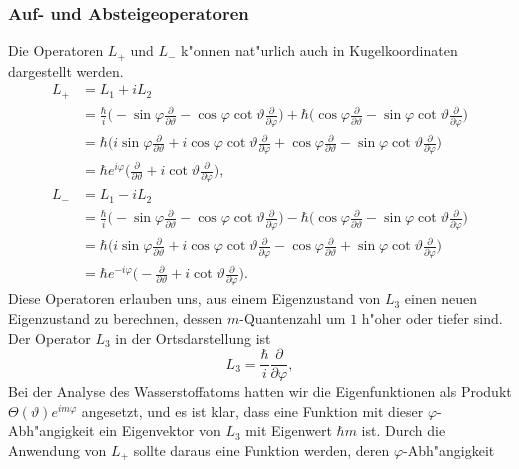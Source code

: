 \subsubsection{Auf- und Absteigeoperatoren}
Die Operatoren $L_+$ und $L_-$ k"onnen nat"urlich auch in Kugelkoordinaten
dargestellt werden.
\begin{align*}
L_+
&=
L_1+iL_2
\\
&=
\frac{\hbar}{i}\biggl(
-\sin\varphi\frac{\partial}{\partial\vartheta}
-\cos\varphi\cot\vartheta\frac{\partial}{\partial\varphi}
\biggr)
+\hbar\biggl(
\cos\varphi\frac{\partial}{\partial\vartheta}
-\sin\varphi\cot\vartheta\frac{\partial}{\partial\varphi}
\biggr)
\\
&=
\hbar\biggl(
i\sin\varphi\frac{\partial}{\partial\vartheta}
+i\cos\varphi\cot\vartheta\frac{\partial}{\partial\varphi}
+
\cos\varphi\frac{\partial}{\partial\vartheta}
-\sin\varphi\cot\vartheta\frac{\partial}{\partial\varphi}
\biggr)
\\
&=\hbar e^{i\varphi}\biggl(
\frac{\partial}{\partial\vartheta}
+
i\cot\vartheta\frac{\partial}{\partial\varphi}
\biggr),
\\
L_-
&=
L_1-iL_2
\\
&=
\frac{\hbar}{i}\biggl(
-\sin\varphi\frac{\partial}{\partial\vartheta}
-\cos\varphi\cot\vartheta\frac{\partial}{\partial\varphi}
\biggr)
-\hbar\biggl(
\cos\varphi\frac{\partial}{\partial\vartheta}
-\sin\varphi\cot\vartheta\frac{\partial}{\partial\varphi}
\biggr)
\\
&=
\hbar\biggl(
i\sin\varphi\frac{\partial}{\partial\vartheta}
+
i\cos\varphi\cot\vartheta\frac{\partial}{\partial\varphi}
-
\cos\varphi\frac{\partial}{\partial\vartheta}
+\sin\varphi\cot\vartheta\frac{\partial}{\partial\varphi}
\biggr)
\\
&=
\hbar e^{-i\varphi}
\biggl(
-
\frac{\partial}{\partial\vartheta}
+i
\cot\vartheta\frac{\partial}{\partial\varphi}
\biggr).
\end{align*}
Diese Operatoren erlauben uns, aus einem Eigenzustand von $L_3$
einen neuen Eigenzustand zu berechnen, dessen $m$-Quantenzahl 
um $1$ h"oher oder tiefer sind.
Der Operator $L_3$ in der Ortsdarstellung ist
\[
L_3=\frac{\hbar}{i}\frac{\partial}{\partial\varphi},
\]
Bei der Analyse des Wasserstoffatoms hatten wir die Eigenfunktionen
als Produkt $\Theta(\vartheta) e^{im\varphi}$ angesetzt,  und es ist
klar, dass eine Funktion mit dieser $\varphi$-Abh"angigkeit ein
Eigenvektor von $L_3$ mit Eigenwert $\hbar m$ ist. Durch die Anwendung
von $L_+$ sollte daraus eine Funktion werden, deren $\varphi$-Abh"angigkeit
